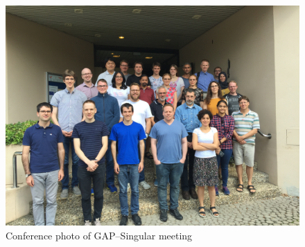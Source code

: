 \begin{event}
\begin{figure}[ht]
  \includegraphics[width=\textwidth]{gap-singular-participants}
  \caption*{Conference photo of GAP--Singular meeting}
\end{figure}

\end{event}
